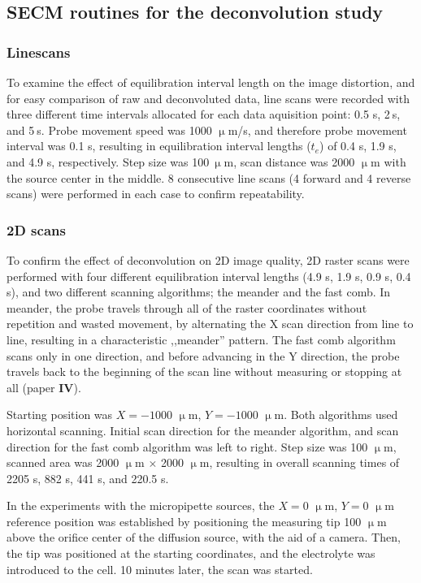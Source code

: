 	\subsection{SECM routines for the deconvolution study}
		\subsubsection{Linescans}

To examine the effect of equilibration interval length on the image distortion, and for easy comparison of raw and deconvoluted data, line scans were recorded with three different time intervals allocated for each data aquisition point: 0.5 s, 2$~$s, and 5$~$s.
Probe movement speed was 1000 $\upmu$m/s, and therefore probe movement interval was 0.1 s, resulting in equilibration interval lengths ($t_e$) of 0.4 s, 1.9 s, and 4.9 s, respectively.
Step size was 100$~\upmu$m, scan distance was 2000 $\upmu$m with the source center in the middle.
8 consecutive line scans (4 forward and 4 reverse scans) were performed in each case to confirm repeatability.

		\subsubsection{2D scans}
To confirm the effect of deconvolution on 2D image quality, 2D raster scans were performed with four different equilibration interval lengths (4.9 s, 1.9 s, 0.9 s, 0.4 s), and two different scanning algorithms; the meander and the fast comb.
In meander, the probe travels through all of the raster coordinates without repetition and wasted movement, by alternating the X scan direction from line to line, resulting in a characteristic ,,meander'' pattern.
The fast comb algorithm scans only in one direction, and before advancing in the Y direction, the probe travels back to the beginning of the scan line without measuring or stopping at all (paper \textbf{IV}).

Starting position was $X = -1000$ $\upmu$m, $Y = -1000$ $\upmu$m.
Both algorithms used horizontal scanning.
Initial scan direction for the meander algorithm, and scan direction for the fast comb algorithm was left to right.
Step size was 100 $\upmu$m, scanned area was 2000 $\upmu$m $\times$ 2000 $\upmu$m, resulting in overall scanning times of 2205 s, 882 s, 441 s, and 220.5 s.

In the experiments with the micropipette sources, the $X = 0$ $\upmu$m, $Y = 0$ $\upmu$m reference position was established by positioning the measuring tip 100 $\upmu$m above the orifice center of the diffusion source, with the aid of a camera.
Then, the tip was positioned at the starting coordinates, and the electrolyte was introduced to the cell.
10 minutes later, the scan was started. 

